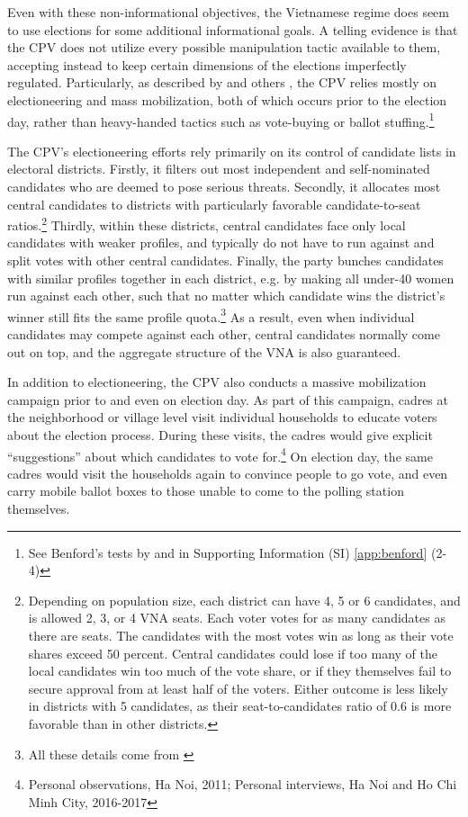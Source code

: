 \documentclass[12pt]{article}
\newcommand\fnote[1]{\footnote{\baselineskip=2\normalbaselineskip#1}}
\newcommand{\1}{\mathbbm{1}}
\begin{document}
Even with these non-informational objectives, the Vietnamese regime does seem to use elections for some additional informational goals. A telling evidence is that the CPV does not utilize every possible manipulation tactic available to them, accepting instead to keep certain dimensions of the elections imperfectly regulated. Particularly, as described by \citet{MaleskySchuler2011} and others \citep[e.g.][]{Gainsborough2005}, the CPV relies mostly on electioneering and mass mobilization, both of which occurs prior to the election day, rather than heavy-handed tactics such as vote-buying or ballot stuffing.\fnote{See Benford's tests by \citet{MaleskySchuler2011} and in Supporting Information (SI) \ref{app:benford} (2-4)}

The CPV's electioneering efforts rely primarily on its control of candidate lists in electoral districts. Firstly, it filters out most independent and self-nominated candidates who are deemed to pose serious threats. Secondly, it allocates most central candidates to districts with particularly favorable candidate-to-seat ratios.\fnote{Depending on population size, each district can have 4, 5 or 6 candidates, and is allowed 2, 3, or 4 VNA seats. Each voter votes for as many candidates as there are seats. The candidates with the most votes win as long as their vote shares exceed 50 percent. Central candidates could lose if too many of the local candidates win too much of the vote share, or if they themselves fail to secure approval from at least half of the voters. Either outcome is less likely in districts with 5 candidates, as their seat-to-candidates ratio of $0.6$ is more favorable than in other districts.} Thirdly, within these districts, central candidates face only local candidates with weaker profiles, and typically do not have to run against and split votes with other central candidates. Finally, the party bunches candidates with similar profiles together in each district, e.g. by making all under-40 women run against each other, such that no matter which candidate wins the district's winner still fits the same profile quota.\fnote{All these details come from \citet{MaleskySchuler2011}} As a result, even when individual candidates may compete against each other, central candidates normally come out on top, and the aggregate structure of the VNA is also guaranteed. 

In addition to electioneering, the CPV also conducts a massive mobilization campaign prior to and even on election day. As part of this campaign, cadres at the neighborhood or village level visit individual households to educate voters about the election process. During these visits, the cadres would give explicit ``suggestions'' about which candidates to vote for.\fnote{Personal observations, Ha Noi, 2011; Personal interviews, Ha Noi and Ho Chi Minh City, 2016-2017} On election day, the same cadres would visit the households again to convince people to go vote, and even carry mobile ballot boxes to those unable to come to the polling station themselves.
\end{document}
